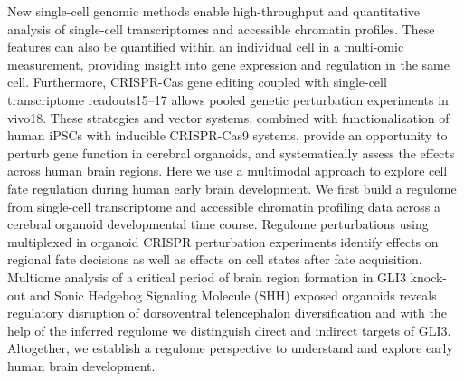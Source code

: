 New single-cell genomic methods enable high-throughput and quantitative analysis of single-cell transcriptomes and accessible chromatin profiles. These features can also be quantified within an individual cell in a multi-omic measurement, providing insight into gene expression and regulation in the same cell. Furthermore, CRISPR-Cas gene editing coupled with single-cell transcriptome readouts15–17 allows pooled genetic perturbation experiments in vivo18. These strategies and vector systems, combined with functionalization of human iPSCs with inducible CRISPR-Cas9 systems, provide an opportunity to perturb gene function in cerebral organoids, and systematically assess the effects across human brain regions.
Here we use a multimodal approach to explore cell fate regulation during human early brain development. We first build a regulome from single-cell transcriptome and accessible chromatin profiling data across a cerebral organoid developmental time course. Regulome perturbations using multiplexed in organoid CRISPR perturbation experiments identify effects on regional fate decisions as well as effects on cell states after fate acquisition. Multiome analysis of a critical period of brain region formation in GLI3 knock-out and Sonic Hedgehog Signaling Molecule (SHH) exposed organoids reveals regulatory disruption of dorsoventral telencephalon diversification and with the help of the inferred regulome we distinguish direct and indirect targets of GLI3. Altogether, we establish a regulome perspective to understand and explore early human brain development.
 
